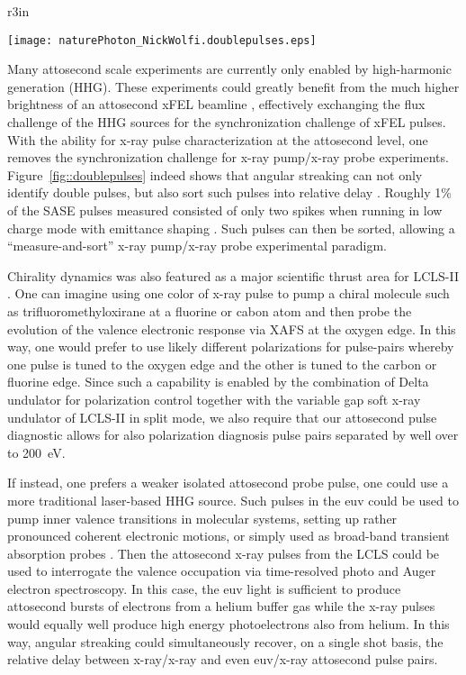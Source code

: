 \begin{wrapfigure}[9]{r}{3in}
\vspace{-3\baselineskip}
\centerline{\texttt{[image: naturePhoton\_NickWolfi.doublepulses.eps]}}
\vspace{-0.5\baselineskip}
\caption{\label{fig::doublepulses}Reproduced from Ref.~\cite{Nick2018}.
}
\end{wrapfigure}
Many attosecond scale experiments are currently only enabled by high-harmonic generation (HHG)\cite{Lewenstein1994,Hentschel2001,Chen2014,Biegert2014,Schmidt2016,Biegert2016,WornerSci2017,Zenghu2017}.
These experiments could greatly benefit from the much higher brightness of an attosecond xFEL beamline \cite{Ding2009,Xiang2009,xLEAP}, effectively exchanging the flux challenge of the HHG sources for the synchronization challenge of xFEL pulses.
With the ability for x-ray pulse characterization at the attosecond level, one removes the synchronization challenge for x-ray pump/x-ray probe experiments.
Figure~\ref{fig::doublepulses} indeed shows that angular streaking can not only identify double pulses, but also sort such pulses into relative delay \cite{Nick2018}.
Roughly 1\% of the SASE pulses measured consisted of only two spikes when running in low charge mode with emittance shaping \cite{EmmaFoil}.
Such pulses can then be sorted, allowing a ``measure-and-sort'' x-ray pump/x-ray probe experimental paradigm.

Chirality dynamics was also featured as a major scientific thrust area for LCLS-II \cite{lcls2_opportunities}.
One can imagine using one color of x-ray pulse to pump a chiral molecule such as trifluoromethyloxirane \cite{Ilchen2017} at a fluorine or cabon atom and then probe the evolution of the valence electronic response via XAFS at the oxygen edge.
In this way, one would prefer to use likely different polarizations for pulse-pairs whereby one pulse is tuned to the oxygen edge and the other is tuned to the carbon or fluorine edge.
Since such a capability is enabled by the combination of Delta undulator for polarization control together with the variable gap soft x-ray undulator of LCLS-II in split mode, we also require that our attosecond pulse diagnostic allows for also polarization diagnosis pulse pairs separated by well over to 200~eV.

If instead, one prefers a weaker isolated attosecond probe pulse, one could use a more traditional laser-based HHG source.
Such pulses in the euv could be used to pump inner valence transitions in molecular systems, setting up rather pronounced coherent electronic motions, or simply used as broad-band transient absorption probes \cite{Biegert2016}.
Then the attosecond x-ray pulses from the LCLS could be used to interrogate the valence occupation via time-resolved photo and Auger electron spectroscopy.
In this case, the euv light is sufficient to produce attosecond bursts of electrons from a helium buffer gas while the x-ray pulses would equally well produce high energy photoelectrons also from helium.
In this way, angular streaking could simultaneously recover, on a single shot basis, the relative delay between x-ray/x-ray and even euv/x-ray attosecond pulse pairs.


